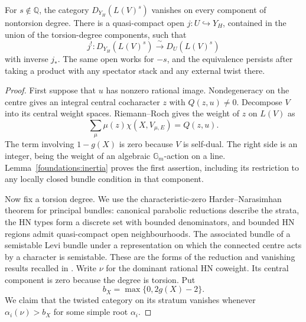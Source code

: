 \begin{proposition}\label{foundations:cutoff}
For $s\notin\mathbb Q$, the category $D_{Y_H}(L(V)^s)$ vanishes on every
component of nontorsion degree.  There is a quasi-compact open
$j:U\hookrightarrow Y_H$, contained in the union of the torsion-degree
components, such that
\begin{equation}\label{foundations:cutoff-equivalence}
 j^!:D_{Y_H}(L(V)^s)\xrightarrow{\ \sim\ }D_U(L(V)^s)
\end{equation}
with inverse $j_*$.  The same open works for $-s$, and the equivalence
persists after taking a product with any spectator stack and any external
twist there.
\end{proposition}

\begin{proof}
First suppose that $u$ has nonzero rational image.  Nondegeneracy on the
centre gives an integral central cocharacter $z$ with $Q(z,u)\ne0$.
Decompose $V$ into its central weight spaces.  Riemann--Roch gives the
weight of $z$ on $L(V)$ as
\begin{equation}\label{foundations:rr-weight}
 \sum_{\mu}\mu(z)\chi(X,V_{\mu,E})=Q(z,u).
\end{equation}
The term involving $1-g(X)$ is zero because $V$ is self-dual.
The right side is an integer, being the weight of an algebraic
$\mathbb G_m$-action on a line.  Lemma~\ref{foundations:inertia} proves the
first assertion, including its restriction to any locally closed bundle
condition in that component.

Now fix a torsion degree.  We use the characteristic-zero
Harder--Narasimhan theorem for principal bundles: canonical parabolic
reductions describe the strata, the HN types form a discrete set with
bounded denominators, and bounded HN regions admit quasi-compact open
neighbourhoods.  The associated bundle of a semistable Levi bundle under
a representation on which the connected centre acts by a character is
semistable.  These are the forms of the reduction and vanishing results
recalled in \cite[Sections~7.3--7.4 and~10.1]{DrinfeldGaitsgoryBun}.
Write $\nu$ for the dominant rational HN coweight.  Its central component
is zero because the degree is torsion.  Put
\[
 b_X=\max\{0,2g(X)-2\}.
\]
We claim that the twisted category on its stratum vanishes whenever
$\alpha_i(\nu)>b_X$ for some simple root $\alpha_i$.


\end{proof}

